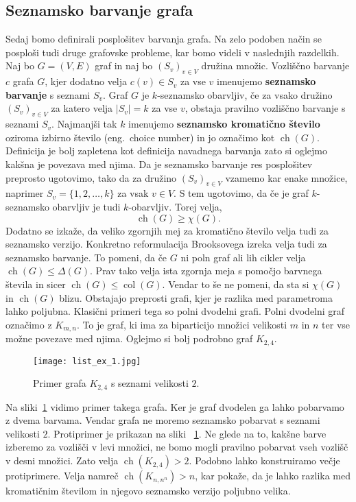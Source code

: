 \documentclass[12pt,a4paper,twoside]{article}
\theoremstyle{definition} %
\theoremstyle{plain} %
\numberwithin{equation}{section}  %
\DeclareMathOperator{\col}{col}
\DeclareMathOperator{\ch}{ch}
\begin{document}
\subsection{Seznamsko barvanje grafa}
Sedaj bomo definirali posplošitev barvanja grafa. Na zelo podoben način se posploši tudi druge grafovske probleme, kar bomo videli v naslednjih razdelkih. Naj bo $G = (V, E)$ graf in naj bo $(S_v)_{v \in V}$ družina množic. Vozliščno barvanje $c$ grafa $G$, kjer dodatno velja $c(v) \in S_v$ za vse $v$ imenujemo \textbf{seznamsko barvanje} s seznami $S_v$. Graf $G$ je $k$-seznamsko obarvljiv, če za vsako družino  $(S_v)_{v \in V}$ za katero velja $|S_v| = k$ za vse $v$, obstaja pravilno vozliščno barvanje s seznami $S_v$. Najmanjši tak $k$ imenujemo \textbf{seznamsko kromatično število} oziroma izbirno število (eng.\ choice number) in jo označimo kot $\ch(G)$.
Definicija je bolj zapletena kot definicija navadnega barvanja zato si oglejmo kakšna je povezava med njima. Da je seznamsko barvanje res posplošitev preprosto ugotovimo, tako da za družino  $(S_v)_{v \in V}$ vzamemo kar enake množice, naprimer $S_v = \{1,2, \ldots, k\}$ za vsak $v \in V$.  S tem ugotovimo, da če je graf $k$-seznamsko obarvljiv je tudi $k$-obarvljiv. Torej velja, 
$$ \ch(G) \ge \chi(G).$$
Dodatno se izkaže, da veliko zgornjih mej za kromatično število velja tudi za seznamsko verzijo. Konkretno reformulacija Brooksovega izreka velja tudi za seznamsko barvanje. To pomeni, da če $G$ ni poln graf ali lih cikler velja $\ch(G) \le \Delta(G)$.  Prav tako velja ista zgornja meja s pomočjo barvnega števila in sicer $\ch(G) \le \col(G)$. Vendar to še ne pomeni, da sta si $\chi(G)$ in $\ch(G)$ blizu. Obstajajo preprosti grafi, kjer je razlika med parametroma lahko poljubna. Klasični primeri tega so polni dvodelni grafi. Polni dvodelni graf označimo z $K_{m,n}$. To je graf, ki ima za biparticijo množici velikosti $m$ in $n$ ter vse možne povezave med njima. Oglejmo si bolj podrobno graf $K_{2, 4}$.

 \begin{figure}[h!]
\caption{Primer grafa $K_{2, 4}$ s seznami velikosti $2$.}
\label{list_ex_1}
\centering
    \texttt{[image: list\_ex\_1.jpg]}
    \end{figure}
Na sliki~\ref{list_ex_1} vidimo primer takega grafa. Ker je graf dvodelen ga lahko pobarvamo z dvema barvama. Vendar grafa ne moremo seznamsko pobarvat s seznami velikosti $2$. Protiprimer je prikazan na sliki ~\ref{list_ex_1}. Ne glede na to, kakšne barve izberemo za vozlišči v levi množici, ne bomo mogli pravilno pobarvat vseh vozlišč v desni množici. Zato velja $\ch(K_{2, 4}) > 2$. Podobno lahko konstruiramo večje protiprimere. Velja namreč $\ch(K_{n, n^n}) > n$, kar pokaže, da je lahko razlika med kromatičnim številom in njegovo seznamsko verzijo poljubno velika.
\end{document}
